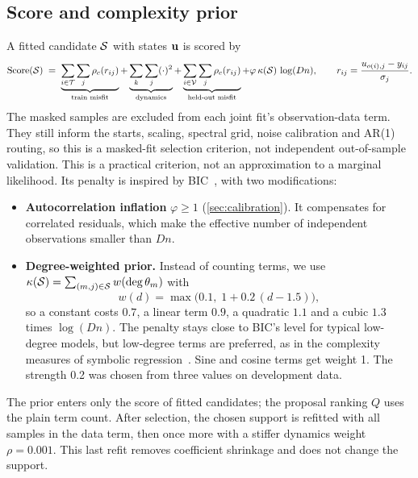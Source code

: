 \subsection{Score and complexity prior}
\label{sec:score}
A fitted candidate $\mathcal{S}$ with states $\mathbf{u}$ is scored by
\begin{equation}
\mathrm{Score}(\mathcal{S}) \;=\; \underbrace{\sum_{i\in\mathcal{T}}\sum_j\rho_c(r_{ij})}_{\text{train misfit}} + \underbrace{\sum_k\sum_j(\cdot)^2}_{\text{dynamics}} + \underbrace{\sum_{i\in\mathcal{V}}\sum_j\rho_c(r_{ij})}_{\text{held-out misfit}} + \varphi\,\kappa(\mathcal{S})\,\log(Dn),
\qquad r_{ij}=\frac{u_{o(i),j}-y_{ij}}{\sigma_j}.
\label{eq:score}
\end{equation}
The masked samples are excluded from each joint fit's observation-data term. They still inform the starts, scaling, spectral grid, noise calibration and AR(1) routing, so this is a masked-fit selection criterion, not independent out-of-sample validation. This is a practical criterion, not an approximation to a marginal likelihood. Its penalty is inspired by BIC~\citep{schwarz1978bic}, with two modifications:
\begin{itemize}[leftmargin=*,itemsep=1pt]
\item \textbf{Autocorrelation inflation} $\varphi\ge 1$ (\cref{sec:calibration}). It compensates for correlated residuals, which make the effective number of independent observations smaller than $Dn$.
\item \textbf{Degree-weighted prior.} Instead of counting terms, we use $\kappa(\mathcal{S})=\sum_{(m,j)\in\mathcal{S}}w(\deg\theta_m)$ with
\begin{equation}
w(d)=\max\bigl(0.1,\;1+0.2\,(d-1.5)\bigr),
\label{eq:prior}
\end{equation}
so a constant costs $0.7$, a linear term $0.9$, a quadratic $1.1$ and a cubic $1.3$ times $\log(Dn)$. The penalty stays close to BIC's level for typical low-degree models, but low-degree terms are preferred, as in the complexity measures of symbolic regression~\citep{schmidt2009distilling,cranmer2023pysr}. Sine and cosine terms get weight 1. The strength 0.2 was chosen from three values on development data.
\end{itemize}
The prior enters only the score of fitted candidates; the proposal ranking $Q$ uses the plain term count. After selection, the chosen support is refitted with all samples in the data term, then once more with a stiffer dynamics weight $\rho=0.001$. This last refit removes coefficient shrinkage and does not change the support.

